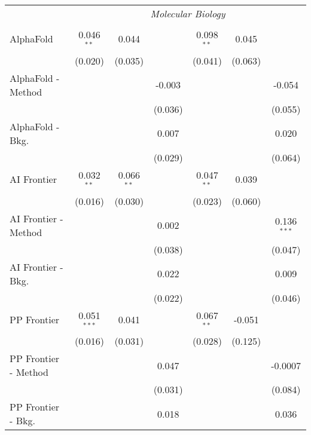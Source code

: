 \begin{tabular}{lcccccc}
 & \multicolumn{6}{c}{\textit{Molecular Biology}} \\ \\
   AlphaFold            & 0.046$^{**}$  & 0.044        &              & 0.098$^{**}$  & 0.045   &   \\   
                        & (0.020)       & (0.035)      &              & (0.041)       & (0.063) &   \\   
   AlphaFold - Method   &               &              & -0.003       &               &         & -0.054\\   
                        &               &              & (0.036)      &               &         & (0.055)\\   
   AlphaFold - Bkg.     &               &              & 0.007        &               &         & 0.020\\   
                        &               &              & (0.029)      &               &         & (0.064)\\   
   AI Frontier          & 0.032$^{**}$  & 0.066$^{**}$ &              & 0.047$^{**}$  & 0.039   &   \\   
                        & (0.016)       & (0.030)      &              & (0.023)       & (0.060) &   \\   
   AI Frontier - Method &               &              & 0.002        &               &         & 0.136$^{***}$\\   
                        &               &              & (0.038)      &               &         & (0.047)\\   
   AI Frontier - Bkg.   &               &              & 0.022        &               &         & 0.009\\   
                        &               &              & (0.022)      &               &         & (0.046)\\   
   PP Frontier          & 0.051$^{***}$ & 0.041        &              & 0.067$^{**}$  & -0.051  &   \\   
                        & (0.016)       & (0.031)      &              & (0.028)       & (0.125) &   \\   
   PP Frontier - Method &               &              & 0.047        &               &         & -0.0007\\   
                        &               &              & (0.031)      &               &         & (0.084)\\   
   PP Frontier - Bkg.   &               &              & 0.018        &               &         & 0.036\\   

\end{tabular}
